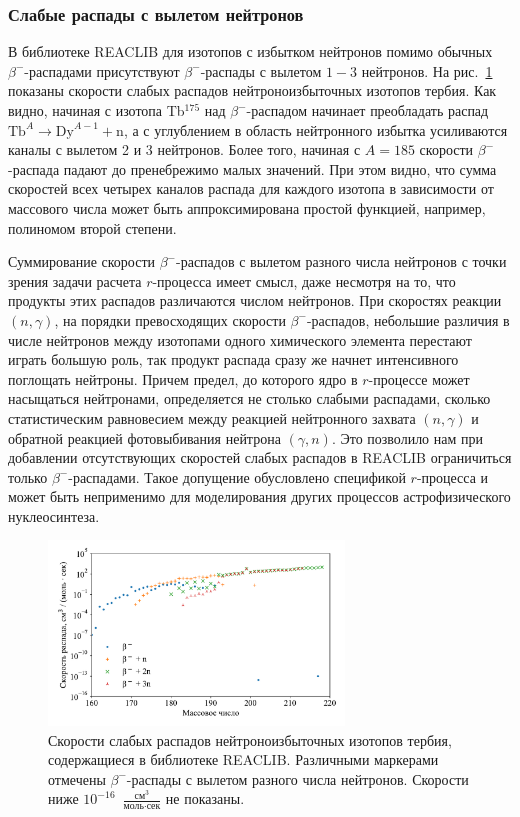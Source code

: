 \subsubsection{Слабые распады с вылетом нейтронов}
  В библиотеке REACLIB для изотопов с избытком нейтронов помимо обычных $\beta^-$-распадами присутствуют $\beta^-$-распады с вылетом $1-3$ нейтронов. На рис.~\ref{img:decays_tb} показаны скорости слабых распадов нейтроноизбыточных изотопов тербия. Как видно, начиная с изотопа Tb$^{175}$ над $\beta^-$-распадом начинает преобладать распад $\text{Tb}^A \rightarrow \text{Dy}^{A-1} + \text{n}$, а с углублением в область нейтронного избытка усиливаются каналы с вылетом 2 и 3 нейтронов. Более того, начиная с $A = 185$ скорости $\beta^-$-распада падают до пренебрежимо малых значений. При этом видно, что сумма скоростей всех четырех каналов распада для каждого изотопа в зависимости от массового числа может быть аппроксимирована простой функцией, например, полиномом второй степени.

  Суммирование скорости $\beta^-$-распадов с вылетом разного числа нейтронов с точки зрения задачи расчета $r$-процесса имеет смысл, даже несмотря на то, что продукты этих распадов различаются числом нейтронов. При скоростях реакции $(n,\gamma)$, на порядки превосходящих скорости $\beta^-$-распадов, небольшие различия в числе нейтронов между изотопами одного химического элемента перестают играть большую роль, так продукт распада сразу же начнет интенсивного поглощать нейтроны. Причем предел, до которого ядро в $r$-процессе может насыщаться нейтронами, определяется не столько слабыми распадами, сколько статистическим равновесием между реакцией нейтронного захвата $(n,\gamma)$ и обратной реакцией фотовыбивания нейтрона $(\gamma,n)$. Это позволило нам при добавлении отсутствующих скоростей слабых распадов в REACLIB ограничиться только $\beta^-$-распадами. Такое допущение обусловлено спецификой $r$-процесса и может быть неприменимо для моделирования других процессов астрофизического нуклеосинтеза. 

\begin{figure}
  \centering
  \includegraphics[width=0.7\textwidth]{pics/decays_tb.pdf}
  \caption{Скорости слабых распадов нейтроноизбыточных изотопов тербия, содержащиеся в библиотеке REACLIB. Различными маркерами отмечены $\beta^-$-распады с вылетом разного числа нейтронов. Скорости ниже $10^{-16}$~$\frac{\text{см}^3}{\text{моль}\cdot\text{сек}}$ не показаны.}
  \label{img:decays_tb}
\end{figure}

